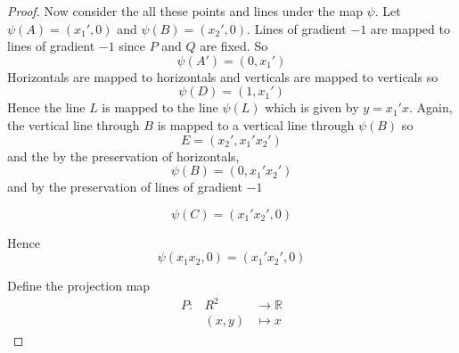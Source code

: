 \documentclass[honours]{UNSWthesis}
\newcommand{\R}{\mathbb{R}}
\newcommand{\1}{\mathbf{e}_{1}}
\newcommand{\2}{\mathbf{e}_{3}}
\newcommand{\3}{\mathbf{e}_{3}}
\begin{document}
\begin{proof}
Now consider the all these points and lines under the map $\psi$. Let $\psi(A)=(x_{1}',0)$ and $\psi(B)=(x_{2}',0) $. Lines of gradient $-1$ are mapped to lines of gradient $-1$ since $P$ and $Q$ are fixed. So 
\[
\psi(A')=(0,x_{1}')
\]
Horizontals are mapped to horizontals and verticals are mapped to verticals so
\[
\psi(D)=(1,x_{1}')
\]
Hence the line $L$ is mapped to the line $\psi(L)$ which is given by $y=x_{1}'x$. Again, the vertical line through $B$ is mapped to a vertical line through $\psi(B)$ so 
\[
E=(x_{2}',x_{1}'x_{2}')
\]
and the by the preservation of horizontals, 
\[
\psi(B)=(0,x_{1}'x_{2}')
\]
and by the preservation of lines of gradient $-1$


\[
\psi(C)=(x_{1}'x_{2}',0)
\]

Hence 
\begin{equation*}
\psi(x_{1}x_{2},0)= (x_{1}'x_{2}',0)
\end{equation*}

Define the projection map
\begin{eqnarray*}
P: &R^{2}& \longrightarrow \R \\
&(x,y)& \longmapsto x
\end{eqnarray*}


\end{proof}
\end{document}
